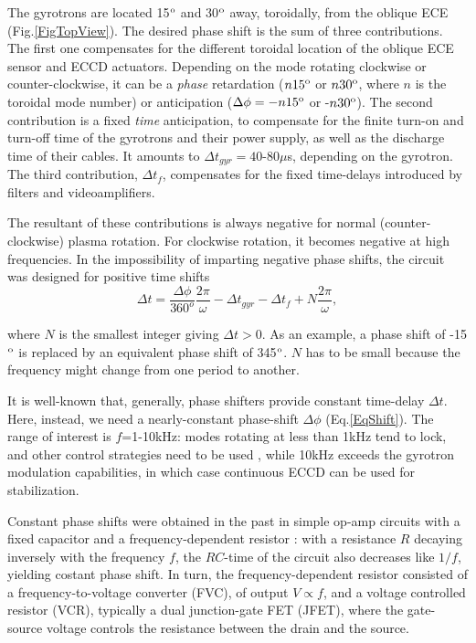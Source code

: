 \documentclass[aps,pra,twocolumn]{revtex4}
\begin{document}
The gyrotrons are located 15$^{\rm o}$ and 30$^{\rm o}$ away, 
toroidally, from the oblique ECE (Fig.\ref{FigTopView}).  
The desired phase shift is the sum of three contributions. 
The first one compensates for the different toroidal location of the 
oblique ECE sensor and ECCD actuators. Depending on the mode rotating  
clockwise or counter-clockwise, it can be a {\em phase} retardation  
($n15^{\rm o}$ or $n30^{\rm o}$, where $n$ is  the toroidal mode number)
or anticipation ($\Delta \phi =-n15^{\rm o}$ or -$n30^{\rm o}$). 
The second contribution is a fixed 
{\em time} anticipation, to compensate for the finite turn-on
and turn-off time of the gyrotrons and their power supply, as well as
the discharge time of their cables. It amounts to $\Delta t
_{gyr} =40$-$80\mu$s,  depending on the gyrotron. 
The third contribution, $\Delta t_f$, compensates for the  
fixed time-delays introduced by filters and videoamplifiers.  

The resultant of these contributions is always negative for
normal (counter-clockwise) plasma rotation. For clockwise rotation, it  
becomes negative at high frequencies.  
In the impossibility of imparting negative phase shifts, 
the circuit was designed for positive time shifts  
%
\begin{equation}
\Delta t = 
\frac{\Delta \phi}{360^o} \frac{2\pi}{\omega} -\Delta t_{gyr} -\Delta t_f
+N\frac{2\pi}{\omega},   \label{EqShift}
\end{equation}

where $N$ is the smallest integer giving $\Delta t>$0. 
As an example, a phase shift of -15$^{\rm o}$ is replaced by an 
equivalent phase shift of 345$^{\rm o}$. $N$ has to be small because the
frequency might change from one period to another. 

It is well-known that, generally, phase shifters provide constant time-delay 
$\Delta t$. 
Here, instead, we need a nearly-constant phase-shift $\Delta \phi$ 
(Eq.\ref{EqShift}). 
The range of interest is $f$=1-10kHz:  
modes rotating at less than 1kHz tend to lock, and other control 
strategies need to be used \cite{PoP}, while 10kHz exceeds the gyrotron 
modulation capabilities, in which case continuous ECCD can be used for 
stabilization. 

Constant phase shifts were obtained in the past 
in simple op-amp circuits with a fixed capacitor and a frequency-dependent 
resistor \cite{Japan,CERN}: with a resistance $R$ decaying inversely
with the frequency $f$, the $RC$-time of the circuit also decreases like
$1/f$, yielding costant phase shift. 
In turn, the frequency-dependent resistor consisted of a frequency-to-voltage
converter (FVC), of output $V \propto f$, 
and a voltage controlled resistor (VCR), typically a 
dual junction-gate FET (JFET), where the gate-source
voltage controls the resistance between the drain and the source. 
\end{document}
